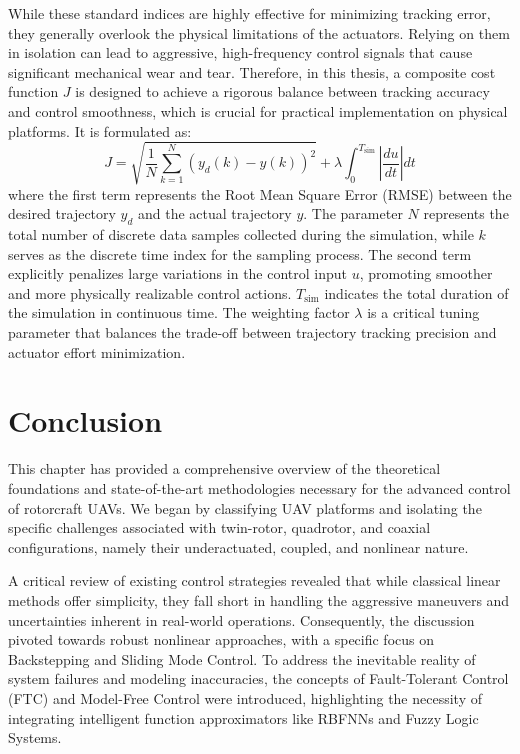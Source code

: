 While these standard indices are highly effective for minimizing tracking error, they generally overlook the physical limitations of the actuators. Relying on them in isolation can lead to aggressive, high-frequency control signals that cause significant mechanical wear and tear. Therefore, in this thesis, a composite cost function $J$ is designed to achieve a rigorous balance between tracking accuracy and control smoothness, which is crucial for practical implementation on physical platforms. It is formulated as:
\begin{equation}
    J = \sqrt{\frac{1}{N} \sum_{k=1}^{N} \left(y_d(k) - y(k)\right)^2} + \lambda \int_{0}^{T_{\text{sim}}} \left| \frac{du}{dt} \right| dt
    \label{eq:cost_function}
\end{equation}
where the first term represents the Root Mean Square Error (RMSE) between the desired trajectory $y_d$ and the actual trajectory $y$. The parameter $N$ represents the total number of discrete data samples collected during the simulation, while $k$ serves as the discrete time index for the sampling process. The second term explicitly penalizes large variations in the control input $u$, promoting smoother and more physically realizable control actions. $T_{\text{sim}}$ indicates the total duration of the simulation in continuous time. The weighting factor $\lambda$ is a critical tuning parameter that balances the trade-off between trajectory tracking precision and actuator effort minimization.



\section{Conclusion}
\label{sec:chap2_conclusion}

This chapter has provided a comprehensive overview of the theoretical foundations and state-of-the-art methodologies necessary for the advanced control of rotorcraft UAVs. We began by classifying UAV platforms and isolating the specific challenges associated with twin-rotor, quadrotor, and coaxial configurations, namely their underactuated, coupled, and nonlinear nature.

A critical review of existing control strategies revealed that while classical linear methods offer simplicity, they fall short in handling the aggressive maneuvers and uncertainties inherent in real-world operations. Consequently, the discussion pivoted towards robust nonlinear approaches, with a specific focus on Backstepping and Sliding Mode Control. To address the inevitable reality of system failures and modeling inaccuracies, the concepts of Fault-Tolerant Control (FTC) and Model-Free Control were introduced, highlighting the necessity of integrating intelligent function approximators like RBFNNs and Fuzzy Logic Systems.

